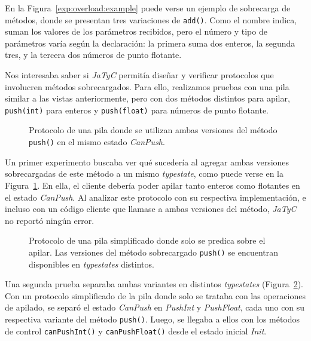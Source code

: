 En la Figura~\ref{exp:overload:example} puede verse un ejemplo de sobrecarga de métodos, donde se presentan tres variaciones de \texttt{add()}. Como el nombre indica, suman los valores de los parámetros recibidos, pero el número y tipo de parámetros varía según la declaración: la primera suma dos enteros, la segunda tres, y la tercera dos números de punto flotante.

Nos interesaba saber si \textit{JaTyC} permitía diseñar y verificar protocolos que involucren métodos sobrecargados. Para ello, realizamos pruebas con una pila similar a las vistas anteriormente, pero con dos métodos distintos para apilar, \texttt{push(int)} para enteros y \texttt{push(float)} para números de punto flotante.

\begin{figure}[htbp]
    \centering
    
    \caption{Protocolo de una pila donde se utilizan ambas versiones del método \texttt{push()} en el mismo estado \textit{CanPush}.}
    \label{exp:overload:protocol-1}
\end{figure}

Un primer experimento buscaba ver qué sucedería al agregar ambas versiones sobrecargadas de este método a un mismo \textit{typestate}, como puede verse en la Figura~\ref{exp:overload:protocol-1}. En ella, el cliente debería poder apilar tanto enteros como flotantes en el estado \textit{CanPush}. Al analizar este protocolo con su respectiva implementación, e incluso con un código cliente que llamase a ambas versiones del método, \textit{JaTyC} no reportó ningún error.

\begin{figure}[htbp]
    \centering
    
    \caption{Protocolo de una pila simplificado donde solo se predica sobre el apilar. Las versiones del método sobrecargado \texttt{push()} se encuentran disponibles en \textit{typestates} distintos.}
    \label{exp:overload:protocol-2}
\end{figure}

Una segunda prueba separaba ambas variantes en distintos \textit{typestates} (Figura~\ref{exp:overload:protocol-2}). Con un protocolo simplificado de la pila donde solo se trataba con las operaciones de apilado, se separó el estado \textit{CanPush} en \textit{PushInt} y \textit{PushFloat}, cada uno con su respectiva variante del método \texttt{push()}. Luego, se llegaba a ellos con los métodos de control \texttt{canPushInt()} y \texttt{canPushFloat()} desde el estado inicial \textit{Init}.

